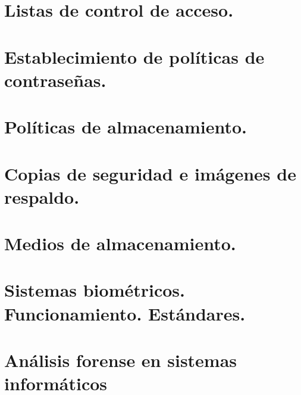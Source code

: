 \documentclass[letterpaper,10pt,spanish]{sphinxmanual}
\begin{document}
\section{Listas de control de acceso.}
\label{\detokenize{tema_pautas_seguridad_informatica/tema_pautas_seguridad_informatica:listas-de-control-de-acceso}}

\section{Establecimiento de políticas de contraseñas.}
\label{\detokenize{tema_pautas_seguridad_informatica/tema_pautas_seguridad_informatica:establecimiento-de-politicas-de-contrasenas}}

\section{Políticas de almacenamiento.}
\label{\detokenize{tema_pautas_seguridad_informatica/tema_pautas_seguridad_informatica:politicas-de-almacenamiento}}

\section{Copias de seguridad e imágenes de respaldo.}
\label{\detokenize{tema_pautas_seguridad_informatica/tema_pautas_seguridad_informatica:copias-de-seguridad-e-imagenes-de-respaldo}}

\section{Medios de almacenamiento.}
\label{\detokenize{tema_pautas_seguridad_informatica/tema_pautas_seguridad_informatica:medios-de-almacenamiento}}

\section{Sistemas biométricos. Funcionamiento. Estándares.}
\label{\detokenize{tema_pautas_seguridad_informatica/tema_pautas_seguridad_informatica:sistemas-biometricos-funcionamiento-estandares}}

\section{Análisis forense en sistemas informáticos}
\label{\detokenize{tema_pautas_seguridad_informatica/tema_pautas_seguridad_informatica:analisis-forense-en-sistemas-informaticos}}
\end{document}
